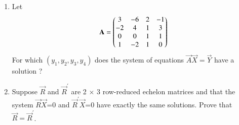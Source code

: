 \begin{enumerate}[label=\thesubsection.\arabic*.,ref=\thesubsection.\theenumi]
\\
\solution

\item Let
\begin{align}
    \mathbf{A}=\begin{pmatrix}3 & -6 & 2 & -1\\-2 & 4 & 1 & 3\\0 & 0 & 1& 1\\1 & -2 & 1 & 0\end{pmatrix} 
\end{align}
For which $(y_1,y_2,y_3,y_4)$ does the system of equations $\vec{A}\vec{X}=\vec{Y}$ have a solution ? 
%
\solution

%
%
\item Suppose $\vec{R}$ and $\vec{R}^{'}$ are 2 $\times$ 3 row-reduced echelon matrices and that the system $\vec{R}$$\vec{X}$=0 and $\vec{R}^{'}\vec{X}$=0 have exactly the same solutions. Prove 
that $\vec{R}=\vec{R}^{'}$.

\solution

\end{enumerate}



